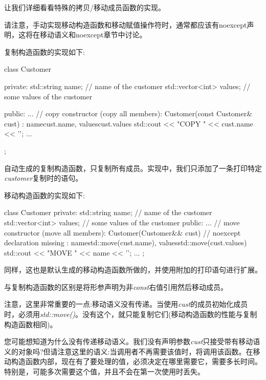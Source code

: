 让我们详细看看特殊的拷贝/移动成员函数的实现。\par

请注意，手动实现移动构造函数和移动赋值操作符时，通常都应该有noexcept声明，这将在移动语义和noexcept章节中讨论。\par


复制构造函数的实现如下:\par

\begin{codebox}[cpp]
class Customer {
private:
  std::string name; // name of the customer
  std::vector<int> values; // some values of the customer

public:
  ...
  // copy constructor (copy all members):
  Customer(const Customer& cust)
  : name{cust.name}, values{cust.values} {
    std::cout << "COPY " << cust.name << '\n';
  }
  ...
};
\end{codebox}

自动生成的复制构造函数，只复制所有成员。实现中，我们只添加了一条打印特定\textit{customer}复制时的语句。\par


移动构造函数的实现如下:\par

\begin{codebox}[cpp]
class Customer {
private:
  std::string name; // name of the customer
  std::vector<int> values; // some values of the customer
public:
  ...
  // move constructor (move all members):
  Customer(Customer&& cust) // noexcept declaration missing
  : name{std::move(cust.name)}, values{std::move(cust.values)} {
    std::cout << "MOVE " << name << '\n';
  }
  ...
};
\end{codebox}

同样，这也是默认生成的移动构造函数所做的，并使用附加的打印语句进行扩展。\par

与复制构造函数的区别是将形参声明为非\textit{const}右值引用然后移动成员。\par

注意，这里非常重要的一点:移动语义没有传递。当使用\textit{cust}的成员初始化成员时，必须用\textit{std::move()}。没有这个，就只能复制它们(移动构造函数的性能与复制构造函数相同)。\par

您可能想知道为什么没有传递移动语义。我们没有声明参数\textit{cust}只接受带有移动语义的对象吗?但请注意这里的语义:当调用者不再需要该值时，将调用该函数。在移动构造函数内部，现在有了要处理的值，必须决定在哪里需要它，需要多长时间。特别是，可能多次需要这个值，并且不会在第一次使用时丢失。\par


